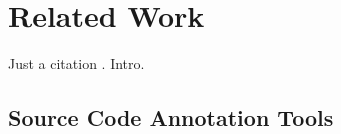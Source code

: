 \section{Related Work}
\label{sec:related}

Just a citation \cite{XXX}. Intro.


\subsection{Source Code Annotation Tools}
